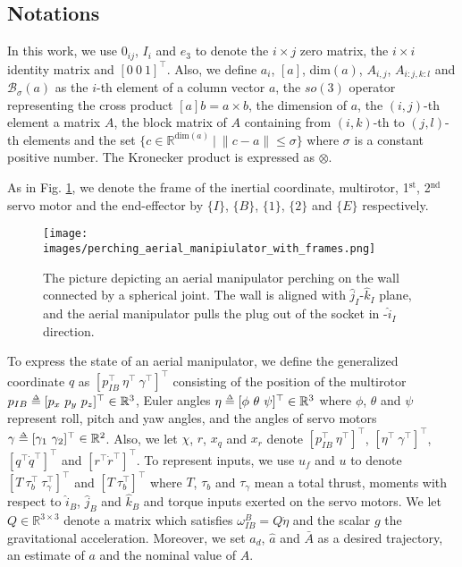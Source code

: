 \documentclass[letterpaper, 10 pt, conference]{ieeeconf}  %
\def\delequal{\mathrel{\ensurestackMath{\stackon[1pt]{=}{\scriptscriptstyle\Delta}}}}
\theoremstyle{definition}
\begin{document}
\subsection{Notations}
In this work, we use $0_{i j}$, $I_{i}$ and $e_3$ to denote the $i \times j$ zero matrix, the $i \times i$ identity matrix and $[0 \ 0 \ 1]^{\top}$. Also, we define $a_i$, $[a]$, dim$(a)$, $A_{i, j}$, $A_{i:j,k:l}$ and $\mathcal{B}_{\sigma}(a)$ as the $i$-th element of a column vector $a$, the $so(3)$ operator representing the cross product $[a]b = a \times b$, the dimension of $a$, the $(i,j)$-th element a matrix $A$, the block matrix of $A$ containing from $(i,k)$-th to $(j,l)$-th elements and the set $\{ c \in \mathbb{R}^{\textrm{dim}(a)} \ | \ \| c - a \| \leq \sigma \}$ where $\sigma$ is a constant positive number. The Kronecker product is expressed as $\otimes$.

As in Fig. \ref{fig: perching aerial manipulator with frames}, we denote the frame of the inertial coordinate, multirotor, 1$^{\textrm{st}}$, 2$^{\textrm{nd}}$ servo motor and the end-effector by $\{ I \}$, $\{ B \}$, $\{ \textit{1} \}$, $\{ \textit{2} \}$ and $\{ E \}$ respectively. 
\begin{figure}[t]
\centering
\texttt{[image: images/perching\_aerial\_manipiulator\_with\_frames.png]}
\caption{The picture depicting an aerial manipulator perching on the wall connected by a spherical joint. The wall is aligned with $\hat{j}_I$-$\hat{k}_I$ plane, and the aerial manipulator pulls the plug out of the socket in -$\hat{i}_I$ direction.} \label{fig: perching aerial manipulator with frames}
\vspace{-0.5cm}
\end{figure}

To express the state of an aerial manipulator, we define the generalized coordinate $q$ as $[p_{I B}^{\top} \ \eta^{\top} \ \gamma^{\top}]^{\top}$ consisting of the position of the multirotor $p_{I B} \delequal [p_x \ p_y \ p_z]^{\top} \in \mathbb{R}^3$, Euler angles $\eta \delequal [\phi \ \theta \ \psi]^{\top} \in \mathbb{R}^3$ where $\phi$, $\theta$ and $\psi$ represent roll, pitch and yaw angles, and the angles of servo motors $\gamma \delequal [\gamma_1 \ \gamma_2]^{\top} \in \mathbb{R}^2$. Also, we let $\chi$, $r$, $x_q$ and $x_r$ denote $[p_{I B}^{\top} \ \eta^{\top}]^{\top}$, $[\eta^{\top} \ \gamma^{\top}]^{\top}$, $[q^{\top} \dot{q}^{\top}]^{\top}$ and $[r^{\top} \dot{r}^{\top}]^{\top}$. 
To represent inputs, we use $u_f$ and $u$ to denote $[T \ \tau_b^{\top} \  \tau_{\gamma}^{\top}]^{\top}$ and $[T \ \tau_b^{\top}]^{\top}$ where $T$, $\tau_b$ and $\tau_{\gamma}$ mean a total thrust, moments with respect to $\hat{i}_B$, $\hat{j}_B$ and $\hat{k}_B$ and torque inputs exerted on the servo motors. We let $Q \in \mathbb{R}^{3 \times 3}$ denote a matrix which satisfies $\omega^{B}_{I B} = Q\dot{\eta}$ and the scalar $g$  the gravitational acceleration. Moreover, we set $a_d$, $\hat{a}$ and $\bar{A}$ as a desired trajectory, an estimate of $a$ and 
the nominal value of $A$.
\end{document}
